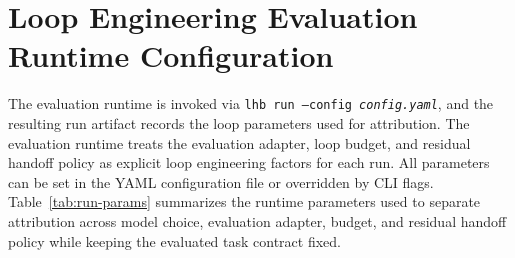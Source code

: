 
\section{Loop Engineering Evaluation Runtime Configuration}
\label{app:run-config}
The \lhb{} evaluation runtime is invoked via \texttt{lhb run --config \textit{config.yaml}}, and the resulting run artifact records the loop parameters used for attribution.
The evaluation runtime treats the evaluation adapter, loop budget, and residual handoff policy as explicit loop engineering factors for each run.
All parameters can be set in the YAML configuration file or overridden by CLI flags. Table~\ref{tab:run-params} summarizes the runtime parameters used to separate attribution across model choice, evaluation adapter, budget, and residual handoff policy while keeping the evaluated task contract fixed.

